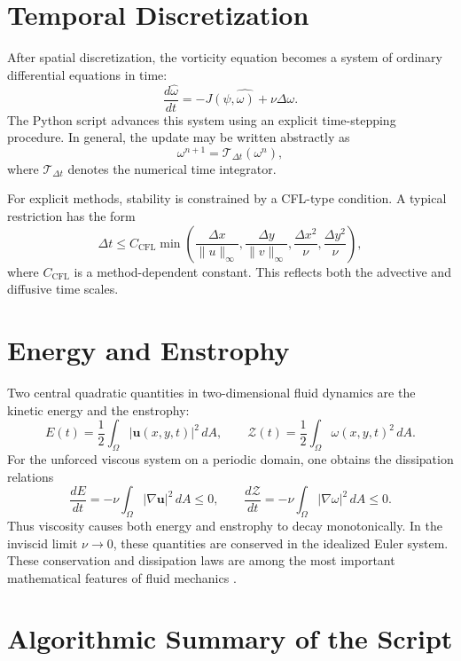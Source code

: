 \documentclass[11pt]{article}
\begin{document}
\section{Temporal Discretization}

After spatial discretization, the vorticity equation becomes a system of ordinary differential equations in time:
\[
\frac{d \widehat{\omega}}{dt}
=
\widehat{-J(\psi,\omega) + \nu \Delta \omega}.
\]
The Python script advances this system using an explicit time-stepping procedure. In general, the update may be written abstractly as
\[
\omega^{n+1} = \mathcal{T}_{\Delta t}(\omega^n),
\]
where $\mathcal{T}_{\Delta t}$ denotes the numerical time integrator.

For explicit methods, stability is constrained by a CFL-type condition. A typical restriction has the form
\[
\Delta t \le C_{\mathrm{CFL}}
\min\left(
\frac{\Delta x}{\|u\|_\infty},
\frac{\Delta y}{\|v\|_\infty},
\frac{\Delta x^2}{\nu},
\frac{\Delta y^2}{\nu}
\right),
\]
where $C_{\mathrm{CFL}}$ is a method-dependent constant. This reflects both the advective and diffusive time scales.

\section{Energy and Enstrophy}

Two central quadratic quantities in two-dimensional fluid dynamics are the kinetic energy and the enstrophy:
\[
E(t) = \frac{1}{2}\int_{\Omega} |\mathbf{u}(x,y,t)|^2 \, dA,
\qquad
\mathcal{Z}(t) = \frac{1}{2}\int_{\Omega} \omega(x,y,t)^2 \, dA.
\]
For the unforced viscous system on a periodic domain, one obtains the dissipation relations
\[
\frac{dE}{dt} = -\nu \int_{\Omega} |\nabla \mathbf{u}|^2\, dA \le 0,
\qquad
\frac{d\mathcal{Z}}{dt} = -\nu \int_{\Omega} |\nabla \omega|^2\, dA \le 0.
\]
Thus viscosity causes both energy and enstrophy to decay monotonically. In the inviscid limit $\nu \to 0$, these quantities are conserved in the idealized Euler system. These conservation and dissipation laws are among the most important mathematical features of fluid mechanics \cite{chorin1993, batchelor1967}.

\section{Algorithmic Summary of the Script}
\end{document}
